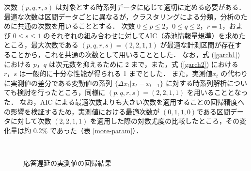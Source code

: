 \documentclass[technicalreport]{ieicej}
\begin{document}
次数 $(p,q,r,s)$ は対象とする時系列データに応じて適切に定める必要がある．
最適な次数は区間データごとに異なるが，クラスタリングによる分類，分析のために共通の次数を用いることとする．
次数 $0\leq p\leq2，0\leq q\leq 2，r=1$，および $0\leq s\leq 1$ のそれぞれの組み合わせに対してAIC（赤池情報量規準）\cite{bozdogan1987model}\cite{burnham2004multimodel}を求めたところ，最大次数である $(p,q,r,s)=(2,2,1,1)$ が最適な計測区間が存在することから，これを共通の次数として用いることとした．
なお，式 (\ref{garch1}) における $p，q$ は次元数を抑えるために 2 まで，また，式 (\ref{garch2}) における $r，s$ は一般的に十分な性能が得られる 1 までとした\cite{hansen2005forecast}．
また，実測値$ x_t$ の代わりに実測値の差分である変動値の系列 $\{\Delta x_t | x_t - x_{t-1} \}$ に対する時系列解析についても検討を行ったところ，同様に $(p,q,r,s)=(2,2,1,1)$ を用いることとなった．
なお，AIC による最適次数よりも大きい次数を適用することの回帰精度への影響を検証するため，実測値における最適次数が $(0,1,1,0) $である区間データに対して次数 $(2,2,1,1)$ を適用した際の対数尤度の比較したところ，その変化量は約 0.2\% であった（表 \ref{more-param}）．

\begin{figure}[tb]
\begin{center}
~
~
\caption{応答遅延の実測値の回帰結果}
\label{norm-reg}
\end{center}
\end{figure}
\end{document}
